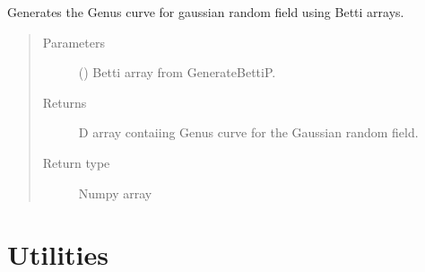 \documentclass[letterpaper,10pt,english]{sphinxmanual}
\begin{document}
\begin{fulllineitems}
\label{\detokenize{topologicalFunc:topologicalFunc.GenerateGenus}}
\sphinxAtStartPar
Generates the Genus curve for gaussian random field using Betti arrays.
\begin{quote}\begin{description}
\item[{Parameters}] \leavevmode
\sphinxAtStartPar
{} () \textendash{} Betti array from GenerateBettiP.

\item[{Returns}] \leavevmode
{}\sphinxhyphen{}D array contaiing Genus curve for the Gaussian random field.

\item[{Return type}] \leavevmode
\sphinxAtStartPar
Numpy array

\end{description}\end{quote}

\end{fulllineitems}



\chapter{Utilities}
\label{\detokenize{utilities:utilities}}\label{\detokenize{utilities:id1}}\label{\detokenize{utilities::doc}}\label{\detokenize{utilities:module-utilities}}
\end{document}
